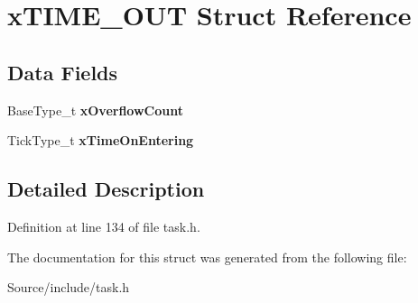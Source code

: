 \hypertarget{structx_t_i_m_e___o_u_t}{}\section{x\+T\+I\+M\+E\+\_\+\+O\+U\+T Struct Reference}
\label{structx_t_i_m_e___o_u_t}
\subsection*{Data Fields}
\begin{DoxyCompactItemize}
\item 
\hypertarget{structx_t_i_m_e___o_u_t_a5d03952a36301f2056265f3fff437b55}{}Base\+Type\+\_\+t {\bfseries x\+Overflow\+Count}\label{structx_t_i_m_e___o_u_t_a5d03952a36301f2056265f3fff437b55}

\item 
\hypertarget{structx_t_i_m_e___o_u_t_adebf6236514a7e0fa24464dcf4100f14}{}Tick\+Type\+\_\+t {\bfseries x\+Time\+On\+Entering}\label{structx_t_i_m_e___o_u_t_adebf6236514a7e0fa24464dcf4100f14}

\end{DoxyCompactItemize}


\subsection{Detailed Description}


Definition at line 134 of file task.\+h.



The documentation for this struct was generated from the following file\+:\begin{DoxyCompactItemize}
\item 
Source/include/task.\+h\end{DoxyCompactItemize}
